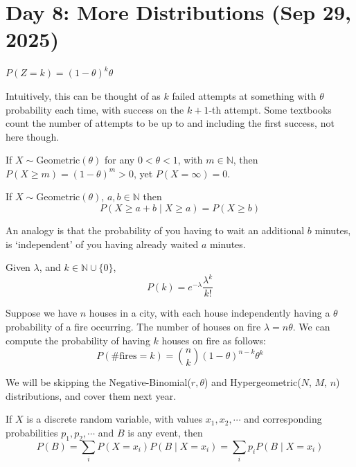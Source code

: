 \section{Day 8: More Distributions (Sep 29, 2025)}

\begin{definition}
    $P(Z = k) = (1 - \theta)^k \theta$ 
\end{definition}

Intuitively, this can be thought of as $k$ failed attempts at something with $\theta$ probability each time, with success on the $k + 1$-th attempt. Some textbooks count the number of attempts to be up to and including the first success, not here though. 

\begin{simplethm}
    If $X \sim \text{Geometric}(\theta)$ for any $0 < \theta < 1$, with $m \in \mathbb{N}$, then $P(X \geq m) = (1 - \theta)^m > 0$, yet $P(X = \infty) = 0$.
\end{simplethm}

\begin{simplethm}
    If $X \sim \text{Geometric}(\theta)$, $a, b \in \mathbb{N}$ then 
\[
    P(X \geq a + b \mid X \geq a) = P(X \geq b)
\]
\end{simplethm}

\noindent An analogy is that the probability of you having to wait an additional $b$ minutes, is `independent' of you having already waited $a$ minutes. 

\begin{definition}
    Given $\lambda$, and $k \in \mathbb{N} \cup \{ 0 \}$,
    \[
    P(k) = e^{-\lambda} \frac{\lambda^k}{k!}
    \]
\end{definition}

\noindent Suppose we have $n$ houses in a city, with each house independently having a $\theta$ probability of a fire occurring. The number of houses on fire $\lambda = n \theta$. We can compute the probability of having $k$ houses on fire as follows:
\[
P(\text{\# fires} = k) = \binom{n}{k} (1-\theta)^{n-k} \theta^{k}
\]

\noindent We will be skipping the Negative-Binomial($r, \theta$) and Hypergeometric($N$, $M$, $n$) distributions, and cover them next year.

\begin{theorem}
If $X$ is a discrete random variable, with values $x_1, x_2, \cdots$ and corresponding probabilities $p_1, p_2, \cdots$ and $B$ is any event, then
\[
    P(B) = \sum_i P(X = x_i) P(B \mid X = x_i) = \sum_i p_i P(B \mid X = x_i)
\]
\end{theorem}

